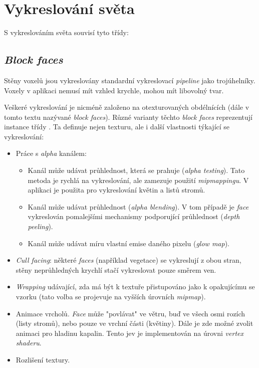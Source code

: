 \section{Vykreslování světa}
S vykreslováním světa souvisí tyto třídy:

\subsection{\textit{Block faces}}
Stěny voxelů jsou vykreslovány standardní vykreslovací \textit{pipeline} jako trojúhelníky. Voxely v aplikaci nemusí mít vzhled krychle, mohou mít libovolný tvar.

Veškeré vykreslování je nicméně založeno na otexturovaných obdélnících (dále v tomto textu nazývané \textit{block faces}). Různé varianty těchto \textit{block faces} reprezentují instance třídy . Ta definuje nejen texturu, ale i další vlastnosti týkající se vykreslování:
\begin{itemize}
	\item Práce s \textit{alpha} kanálem:
	\begin{itemize}
		\item Kanál může udávat průhlednost, která se prahuje (\textit{alpha testing}). Tato metoda je rychlá na vykreslování, ale zamezuje použití \textit{mipmappingu}. V aplikaci je použita pro vykreslování květin a listů stromů.
		\item Kanál může udávat průhlednost (\textit{alpha blending}). V tom případě je \textit{face} vykreslován pomalejšími mechanismy podporující průhlednost (\textit{depth peeling}).
		\item Kanál může udávat míru vlastní emise daného pixelu (\textit{glow map}).
	\end{itemize}
	\item \textit{Cull facing}: některé \textit{faces} (například vegetace) se vykreslují z obou stran, stěny neprůhledných krychlí stačí vykreslovat pouze směrem ven.
	\item \textit{Wrapping} udávající, zda má být k textuře přistupováno jako k opakujícímu se vzorku (tato volba se projevuje na vyšších úrovních \textit{mipmap}).
	\item Animace vrcholů. \textit{Face} může "povlávat" ve větru, buď ve všech osmi rozích (listy stromů), nebo pouze ve vrchní části (květiny). Dále je zde možné zvolit animaci pro hladinu kapalin. Tento jev je implementován na úrovni \textit{vertex shaderu}.
	\item Rozlišení textury.
\end{itemize}

